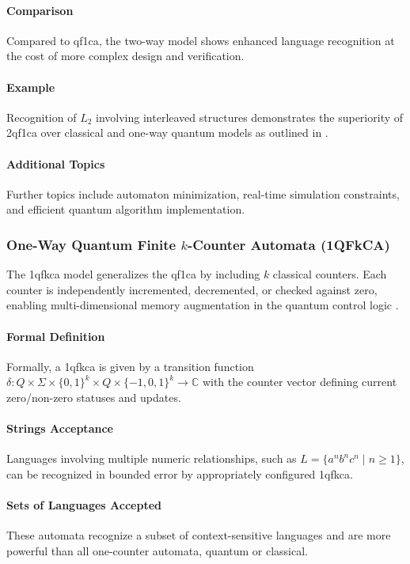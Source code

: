 \paragraph{Comparison}
Compared to \gls{qf1ca}, the two-way model shows enhanced language recognition at the cost of more complex design and verification.

\paragraph{Example}
Recognition of $L_2$ involving interleaved structures demonstrates the superiority of \gls{2qf1ca} over classical and one-way quantum models as outlined in \cite{bonner2001quantum}.

\paragraph{Additional Topics}
Further topics include automaton minimization, real-time simulation constraints, and efficient quantum algorithm implementation.

\subsubsection{One-Way Quantum Finite $k$-Counter Automata (1QFkCA)}

The \gls{1qfkca} model generalizes the \gls{qf1ca} by including $k$ classical counters. Each counter is independently incremented, decremented, or checked against zero, enabling multi-dimensional memory augmentation in the quantum control logic \cite{cem2012quantum}.

\paragraph{Formal Definition}
Formally, a \gls{1qfkca} is given by a transition function $\delta: Q \times \Sigma \times \{0,1\}^k \times Q \times \{-1,0,1\}^k \rightarrow \mathbb{C}$ with the counter vector defining current zero/non-zero statuses and updates.

\paragraph{Strings Acceptance}
Languages involving multiple numeric relationships, such as $L = \{ a^n b^n c^n \mid n \geq 1 \}$, can be recognized in bounded error by appropriately configured \gls{1qfkca}.

\paragraph{Sets of Languages Accepted}
These automata recognize a subset of context-sensitive languages and are more powerful than all one-counter automata, quantum or classical.


